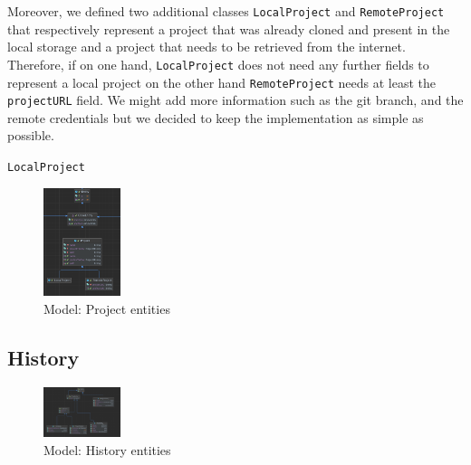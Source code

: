 Moreover, we defined two additional classes \texttt{LocalProject} and \texttt{RemoteProject} that respectively represent a project that was already cloned and present in the local storage and a project that needs to be retrieved from the internet. 
Therefore, if on one hand, \texttt{LocalProject} does not need any further fields to represent a local project on the other hand \texttt{RemoteProject} needs at least the \texttt{projectURL} field. We might add more information such as the git branch, and the remote credentials but we decided to keep the implementation as simple as possible. 

\texttt{LocalProject}

\begin{figure}
    \center
    \includegraphics[width=0.2\textwidth]{UMLProject.png}
    \caption{Model: Project entities}
    \label{fig:modelProject}
\end{figure}

\subsection*{History}

\begin{figure}
    \center
    \includegraphics[width=0.2\textwidth]{UMLHistory.png}
    \caption{Model: History entities}
    \label{fig:modelHistory}
\end{figure}

